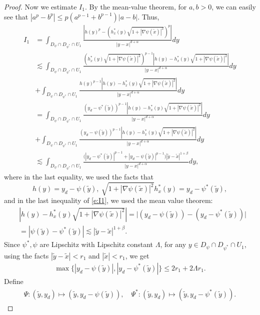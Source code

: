 \documentclass[12pt,a4paper]{amsart}
\numberwithin{equation}{section}
\theoremstyle{plain}
\newcommand{\be}{\beta}
\newcommand{\wt}{\widetilde}
\newcommand{\1}{\mathbbm{1}}
\begin{document}
\begin{proof}
Now we estimate $I_1$. By
the  mean-value theorem, for $a,b>0$, we can easily see that 
$|a^p-b^p|  \le p(a^{p-1}+b^{p-1})|a-b|$. Thus,
\begin{align}\label{e:I1}
I_1 & = \int_{D_{\psi} \cap D_{\psi^*} \cap U_1} \frac{|h(y)^p - (h_x^*(y)\sqrt{1+|\nabla \psi(\wt x)|^2})^p|}{|y-x|^{d+\alpha}}dy \\
&\lesssim
\int_{D_{\psi} \cap D_{\psi^*} \cap U_1} \frac{(h_x^*(y)\sqrt{1+|\nabla \psi(\wt x)|^2})^{p-1}|h(y)- h_x^*(y)\sqrt{1+|\nabla \psi(\wt x)|^2}|}{|y-x|^{d+\alpha}}dy\nonumber\\
& + \int_{D_{\psi} \cap D_{\psi^*} \cap U_1} \frac{h(y)^{p-1}|h(y)- h_x^*(y)\sqrt{1+|\nabla \psi(\wt x)|^2}|}{|y-x|^{d+\alpha}}dy \nonumber\\
& = \int_{D_{\psi} \cap D_{\psi^*} \cap U_1} \frac{(y_d - \psi^*(\wt y))^{p-1}|h(y)- h_x^*(y)\sqrt{1+|\nabla \psi(\wt x)|^2}|}{|y-x|^{d+\alpha}}dy \nonumber\\
& + \int_{D_{\psi} \cap D_{\psi^*} \cap U_1} \frac{(y_d -\psi(\wt y))^{p-1}|h(y)- h_x^*(y)\sqrt{1+|\nabla \psi(\wt x)|^2}|}{|y-x|^{d+\alpha}}dy \nonumber\\
& \lesssim \int_{D_{\psi} \cap D_{\psi^*} \cap U_1} \frac{\big(|y_d - \psi^*(\wt y)|^{p-1} + |y_d - \psi(\wt y)|^{p-1} \big)|\wt y - \wt x|^{1+\beta}}{|y-x|^{d+\alpha}}dy,\nonumber
\end{align}
where in the last equality, we used the facts that $$h(y) = y_d -\psi(\wt y), \ \sqrt{1+|\nabla \psi(\wt x)|^2} h_x^*(y)= y_d - \psi^*(\wt y),$$ and 
in the last inequality of \eqref{e:I1}, we used 
the mean value theorem:
\begin{align*}
& |h(y)- h_x^*(y)\sqrt{1+|\nabla \psi(\wt x)|^2}| = \big|(y_d -\psi(\wt y)) - (y_d - \psi^*(\wt y))\big| \\
& = |\psi(\wt y) -  \psi^*(\wt y)| \lesssim |\wt y - \wt x|^{1+\be}.
\end{align*}
Since $\psi^*, \psi$ are Lipschitz with Lipschitz constant $\Lambda$, for any $y \in D_{\psi} \cap D_{\psi^*} \cap U_1$, using the facts $|\wt y - \wt x|<r_1$ and $|\wt x|<r_1$, we get
\begin{align}\label{e:pre4chv}
   \max\{ |y_d - \psi(\wt y)|, |y_d - \psi^*(\wt y)|\} \le 2r_1 + 2\Lambda r_1. 
\end{align}
Define
\begin{align}\label{eqn:Psi change of variable}
\Psi: (\wt y, y_d)\mapsto (\wt y, y_d - \psi(\wt y)),\quad \Psi^*: (\wt y, y_d)\mapsto (\wt y, y_d - \psi^*(\wt y)).
\end{align}

\end{proof}
\end{document}
